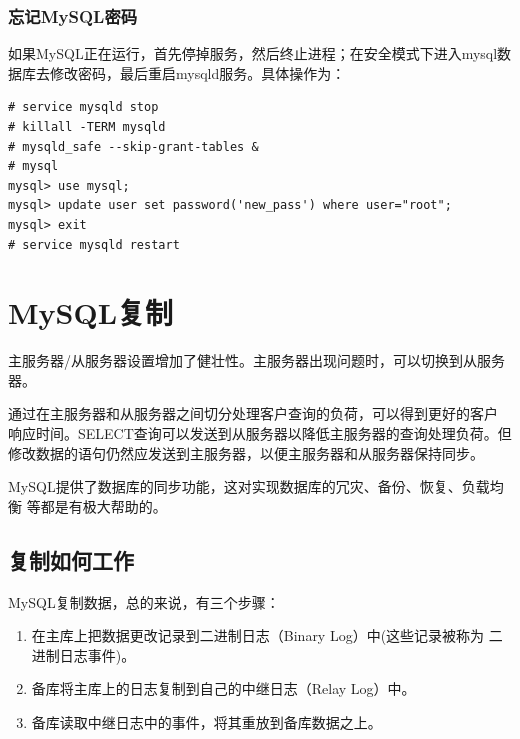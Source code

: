 \subsection{忘记MySQL密码}
\label{sec:ForgotMysqlPass}

如果MySQL正在运行，首先停掉服务，然后终止进程；在安全模式下进入mysql数
据库去修改密码，最后重启mysqld服务。具体操作为：

\begin{verbatim}
# service mysqld stop
# killall -TERM mysqld
# mysqld_safe --skip-grant-tables &
# mysql
mysql> use mysql;
mysql> update user set password('new_pass') where user="root";
mysql> exit
# service mysqld restart
\end{verbatim}

\chapter{MySQL复制}

主服务器/从服务器设置增加了健壮性。主服务器出现问题时，可以切换到从服务
器。

通过在主服务器和从服务器之间切分处理客户查询的负荷，可以得到更好的客户
响应时间。SELECT查询可以发送到从服务器以降低主服务器的查询处理负荷。但
修改数据的语句仍然应发送到主服务器，以便主服务器和从服务器保持同步。

MySQL提供了数据库的同步功能，这对实现数据库的冗灾、备份、恢复、负载均衡
等都是有极大帮助的。

\section{复制如何工作}

MySQL复制数据，总的来说，有三个步骤：

\begin{enumerate}[itemsep=0pt,parsep=0pt]
\item 在主库上把数据更改记录到二进制日志（Binary Log）中(这些记录被称为
  二进制日志事件)。
\item 备库将主库上的日志复制到自己的中继日志（Relay Log）中。
\item 备库读取中继日志中的事件，将其重放到备库数据之上。
\end{enumerate}

